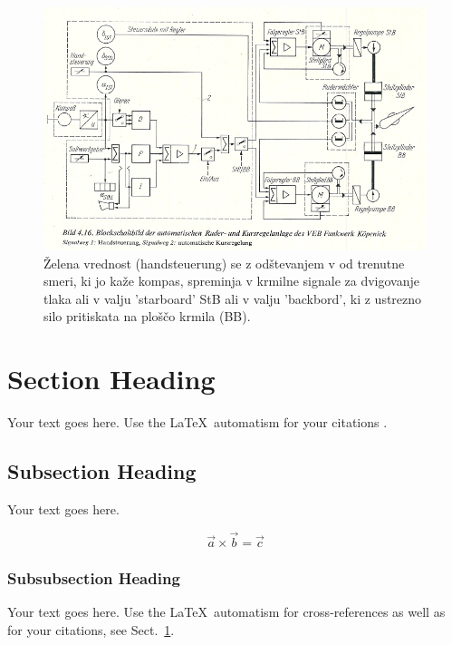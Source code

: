 \begin{figure}
	\centering
	\includegraphics[width=\textwidth]{Predavanja/11_SodobnoKrmarjenjeLadje/figs/SLK4p16.png}
	\caption{Želena vrednost (handsteuerung) se z odštevanjem v od trenutne smeri, ki jo kaže kompas, spreminja v krmilne signale za dvigovanje tlaka ali v valju 'starboard' StB ali v valju 'backbord', ki z ustrezno silo pritiskata na ploščo krmila (BB).}%
	\label{fig:SamodejnoKrmarjenjeStB_BB}       %
\end{figure}






\section{Section Heading}
\label{sec:1}
Your text goes here. Use the \LaTeX\ automatism for your citations
\cite{monograph}.

\subsection{Subsection Heading}
\label{sec:2}
Your text goes here.

\begin{equation}
\vec{a}\times\vec{b}=\vec{c}
\end{equation}

\subsubsection{Subsubsection Heading}
Your text goes here. Use the \LaTeX\ automatism for cross-references as
well as for your citations, see Sect.~\ref{sec:1}.

